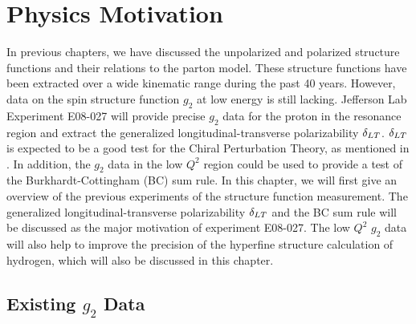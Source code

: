 
\chapter{Physics Motivation}
\label{C4}

In previous chapters, we have discussed the unpolarized and polarized structure functions and their relations to the parton model. These structure functions have been extracted over a wide kinematic range during the past 40 years. However, data on the spin structure function $g_2$ at low energy is still lacking. Jefferson Lab Experiment E08-027 will provide precise $g_2$ data for the proton in the resonance region and extract the generalized longitudinal-transverse polarizability $\delta_{LT}$. $\delta_{LT}$ is expected to be a good test for the Chiral Perturbation Theory, as mentioned in . In addition, the $g_2$ data in the low $Q^2$ region could be used to provide a test of the Burkhardt-Cottingham (BC) sum rule. In this chapter, we will first give an overview of the previous experiments of the structure function measurement. The generalized longitudinal-transverse polarizability $\delta_{LT}$ and the BC sum rule will be discussed as the major motivation of experiment E08-027. The low $Q^2$ $g_2$ data will also help to improve the precision of the hyperfine structure calculation of hydrogen, which will also be discussed in this chapter.

\section{\texorpdfstring{Existing $g_2$ Data}{Existing g2 Data}}
\label{C4S1}

